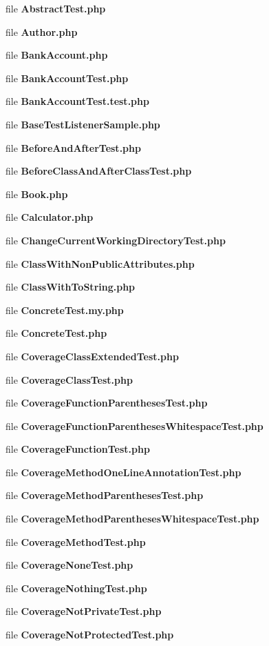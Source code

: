 \begin{DoxyCompactItemize}
\item 
file {\bf Abstract\+Test.\+php}
\item 
file {\bf Author.\+php}
\item 
file {\bf Bank\+Account.\+php}
\item 
file {\bf Bank\+Account\+Test.\+php}
\item 
file {\bf Bank\+Account\+Test.\+test.\+php}
\item 
file {\bf Base\+Test\+Listener\+Sample.\+php}
\item 
file {\bf Before\+And\+After\+Test.\+php}
\item 
file {\bf Before\+Class\+And\+After\+Class\+Test.\+php}
\item 
file {\bf Book.\+php}
\item 
file {\bf Calculator.\+php}
\item 
file {\bf Change\+Current\+Working\+Directory\+Test.\+php}
\item 
file {\bf Class\+With\+Non\+Public\+Attributes.\+php}
\item 
file {\bf Class\+With\+To\+String.\+php}
\item 
file {\bf Concrete\+Test.\+my.\+php}
\item 
file {\bf Concrete\+Test.\+php}
\item 
file {\bf Coverage\+Class\+Extended\+Test.\+php}
\item 
file {\bf Coverage\+Class\+Test.\+php}
\item 
file {\bf Coverage\+Function\+Parentheses\+Test.\+php}
\item 
file {\bf Coverage\+Function\+Parentheses\+Whitespace\+Test.\+php}
\item 
file {\bf Coverage\+Function\+Test.\+php}
\item 
file {\bf Coverage\+Method\+One\+Line\+Annotation\+Test.\+php}
\item 
file {\bf Coverage\+Method\+Parentheses\+Test.\+php}
\item 
file {\bf Coverage\+Method\+Parentheses\+Whitespace\+Test.\+php}
\item 
file {\bf Coverage\+Method\+Test.\+php}
\item 
file {\bf Coverage\+None\+Test.\+php}
\item 
file {\bf Coverage\+Nothing\+Test.\+php}
\item 
file {\bf Coverage\+Not\+Private\+Test.\+php}
\item 
file {\bf Coverage\+Not\+Protected\+Test.\+php}

\end{DoxyCompactItemize}
